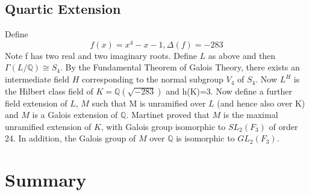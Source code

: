 \documentclass[12pt]{extarticle}
\newcommand{\Q}{\mathbb{Q}}
\newcommand{\<}{\langle}
\renewcommand{\>}{\rangle}
\theoremstyle{definition}
\begin{document}
\subsection{Quartic Extension}
Define  \begin{equation}
    f(x)=x^4-x-1, \Delta(f)=-283
\end{equation}
Note f has two real and two imaginary roots. Define $L$ as above and then $\Gamma(L/\Q)\cong S_4$. By the Fundamental Theorem of Galois Theory, there exists an intermediate field $H$ corresponding to the normal subgroup $V_4$ of $S_4$. Now $L^H$ is the Hilbert class field of $K= \Q(\sqrt{-283})$ and h(K)=3. Now define a further field extension of $L$, $M$ such that M is unramified over $L$ (and hence also over K) and $M$ is a Galois extension of $\Q$. Martinet proved that $M$ is the maximal unramified extension of $K$, with Galois group isomorphic to $SL_2(F_3)$ of order 24. In addition, the Galois group of $M$ over $\Q$ is isomorphic to $GL_2(F_3)$. 
\begin{center}
\end{center}

\section{Summary}




% 

\end{document}
